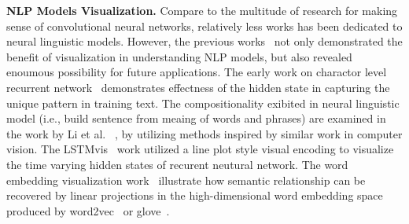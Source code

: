 \noindent\textbf{NLP Models Visualization.}
Compare to the multitude of research for making sense of convolutional neural networks, relatively less works has been dedicated to neural linguistic models.
%
However, the previous works~\cite{KarpathyJohnson2015, LiChenHovy2015, StrobeltGehrmannPfister2018, LiuBremerJayaraman2018} not only demonstrated the benefit of visualization in understanding NLP models, but also revealed enoumous possibility for future applications.
The early work on charactor level recurrent network~\cite{KarpathyJohnson2015} demonstrates effectness of the hidden state in capturing the unique pattern in training text. The compositionality exibited in neural linguistic model (i.e., build sentence from meaing of words and phrases) are examined in the work by Li et al. ~\cite{LiChenHovy2015}, by utilizing methods inspired by similar work in computer vision.
The LSTMvis~\cite{StrobeltGehrmannPfister2018} work utilized a line plot style visual encoding to visualize the time varying hidden states of recurent neutural network. The word embedding visualization work~\cite{LiuBremerJayaraman2018} illustrate how semantic relationship can be recovered by linear projections in the high-dimensional word embedding space produced by word2vec~\cite{MikolovSutskeverChen2013} or glove~\cite{PenningtonSocherManning2014}.
